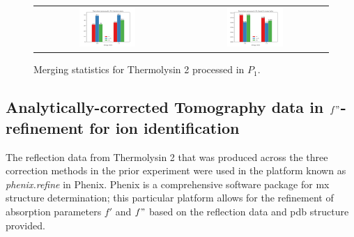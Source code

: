 \begin{figure}[H]
    \centering
    \begin{tabular}{cc}
    \includegraphics[width = 0.4\textwidth]{plots/exp1/tlys_2_P1/I_over_sigma.png} & \includegraphics[width = 0.4\textwidth]{plots/exp1/tlys_2_P1/rmerges.png}
    \end{tabular}
    \caption{Merging statistics for Thermolysin 2 processed in $P_1$.}
    \label{fig:tlys_2_p1}
\end{figure}

\subsection{Analytically-corrected Tomography data in $f"$-refinement for ion identification}


The reflection data from Thermolysin 2 that was produced across the three correction methods in the prior experiment were used in the platform known as \textit{phenix.refine} in Phenix. Phenix is a comprehensive software package for \ac{mx} structure determination; this particular platform allows for the refinement of absorption parameters $f'$ and $f"$ based on the reflection data and \ac{pdb} structure provided.

